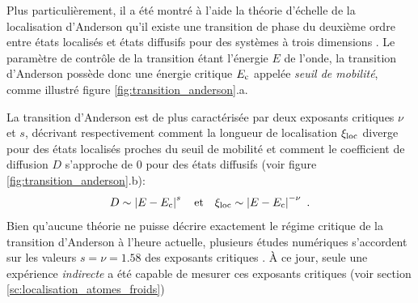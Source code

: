 Plus particulièrement, il a été montré à l'aide la théorie d'échelle de la localisation d'Anderson qu'il existe une transition de phase du deuxième ordre entre états localisés et états diffusifs pour des systèmes à trois dimensions \citep{abrahams1979scaling}. Le paramètre de contrôle de la transition étant l'énergie $E$ de l'onde, la transition d'Anderson possède donc une énergie critique $E_{\mathrm{c}}$ appelée \emph{seuil de mobilité}, comme illustré figure \ref{fig:transition_anderson}.a. 

La transition d'Anderson est de plus caractérisée par deux exposants critiques $\nu$ et $s$, décrivant respectivement comment la longueur de localisation $\xi_{\mathrm{loc}}$ diverge pour des états localisés proches du seuil de mobilité et comment le coefficient de diffusion $D$ s'approche de $0$ pour des états diffusifs (voir figure \ref{fig:transition_anderson}.b):
\begin{equation}
D \sim \left| E-E_{\mathrm{c}} \right|^s \quad \text{et} \quad \xi_{\mathrm{loc}} \sim \left| E-E_{\mathrm{c}} \right|^{-\nu} \text{ .}
\end{equation}
Bien qu'aucune théorie ne puisse décrire exactement le régime critique de la transition d'Anderson à l'heure actuelle, plusieurs études numériques s'accordent sur les valeurs $s=\nu=1.58$ des exposants critiques \citep{slevin1999corrections} \citep{evers2008anderson} \citep{slevin2014critical}. À ce jour, seule une expérience \textit{indirecte} a été capable de mesurer ces exposants critiques (voir section \ref{sc:localisation_atomes_froids}) \citep{lopez2012experimental}


